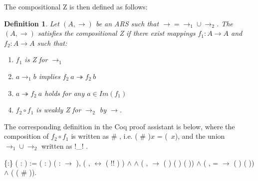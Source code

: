 \documentclass[a4paper]{article}
\newcommand{\tto}{\twoheadrightarrow}
\newtheorem{definition}{Definition}[section]
\begin{document}
The compositional Z is then defined as follows:

\begin{definition}\cite{nakazawaCompositionalConfluenceProofs2016}
  Let $(A,\to)$ be an ARS such that $\to = \to_1 \cup \to_2$. The
  $(A,\to)$ satisfies the compositional Z if there exist mappings
  $f_1:A \to A$ and $f_2:A \to A$ such that:
  \begin{enumerate}
  \item $f_1$ is Z for $\to_1$ 
  \item $a \to_1 b$ implies $f_2\ a \tto f_2\ b$ 
  \item $a \tto f_2\ a$ holds for any $a \in Im(f_1)$ 
  \item $f_2\circ f_1$ is weakly Z for $\to_2$ by $\to$.
  \end{enumerate}
\end{definition}

The corresponding definition in the Coq proof assistant is below,
where the composition of $f_2\circ f_1$ is written as 
\# , i.e. ( \# )$x$ =
(\ $x$), and the union $\to_1 \cup \to_2$
written as  !\_! .

\begin{coqdoccode}
  \coqdocemptyline \coqdocnoindent {}
   \{:\} (
  : ) := \coqdoctac{\ensuremath{\exists}}
  ( :  )
  ( : 
  \ensuremath{\rightarrow} ),
  (\coqdockw{\ensuremath{\forall}}  ,
    
  \ensuremath{\leftrightarrow} ( !\coqdocvar{\_}!
  )  ) \ensuremath{\land}
    
  \ensuremath{\land} (\coqdockw{\ensuremath{\forall}} 
  ,   
  \ensuremath{\rightarrow} ( )
  ( ) ( ))
  \ensuremath{\land} (\coqdockw{\ensuremath{\forall}} 
  ,  =  
  \ensuremath{\rightarrow} ( )
   ( )) \ensuremath{\land}
  (  
  ( \# )).\coqdoceol \coqdocemptyline
  \coqdocemptyline
\end{coqdoccode}
\end{document}
